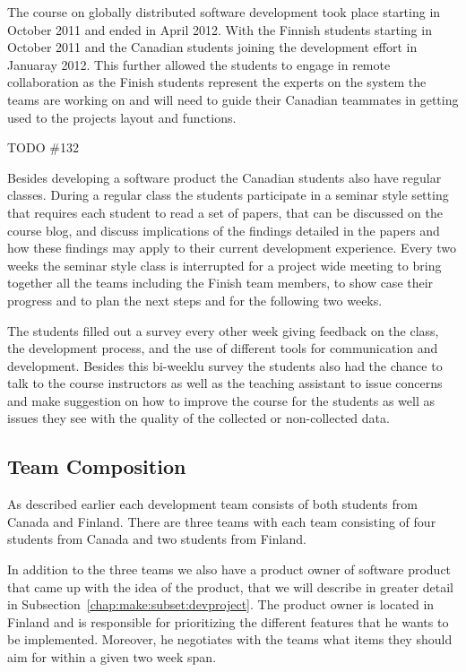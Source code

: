 The course on globally distributed software development took place starting in October 2011 and ended in April 2012.
With the Finnish students starting in October 2011 and the Canadian students joining the development effort in Januaray 2012.
This further allowed the students to engage in remote collaboration as the Finish students represent the experts on the system the teams are working on and will need to guide their Canadian teammates in getting used to the projects layout and functions.

TODO \#132

Besides developing a software product the Canadian students also have regular classes.
During a regular class the students participate in a seminar style setting that requires each student to read a set of papers, that can be discussed on the course blog, and discuss implications of the findings detailed in the papers and how these findings may apply to their current development experience.
Every two weeks the seminar style class is interrupted for a project wide meeting to bring together all the teams including the Finish team members, to show case their progress and to plan the next steps and for the following two weeks.

The students filled out a survey every other week giving feedback on the class, the development process, and the use of different tools for communication and development.
Besides this bi-weeklu survey the students also had the chance to talk to the course instructors as well as the teaching assistant to issue concerns and make suggestion on how to improve the course for the students as well as issues they see with the quality of the collected or non-collected data.

\subsection{Team Composition}
As described earlier each development team consists of both students from Canada and Finland.
There are three teams with each team consisting of four students from Canada and two students from Finland.

In addition to the three teams we also have a product owner of software product that came up with the idea of the product, that we will describe in greater detail in Subsection~\ref{chap:make:subset:devproject}.
The product owner is located in Finland and is responsible for prioritizing the different features that he wants to be implemented.
Moreover, he negotiates with the teams what items they should aim for within a given two week span. 

